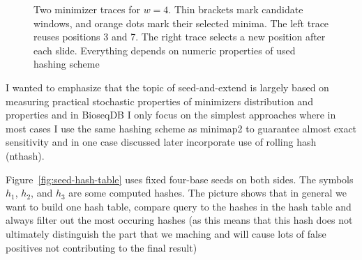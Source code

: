\begin{figure}[H]
\caption{Two minimizer traces for \(w=4\). Thin brackets mark candidate
windows, and orange dots mark their selected minima. The left trace reuses
positions 3 and 7. The right trace selects a new position after each slide. Everything depends on numeric properties of used hashing scheme}
\label{fig:minimizer-density-traces}
\end{figure}

I wanted to emphasize that the topic of seed-and-extend is largely based on measuring practical stochastic properties of minimizers distribution and properties and in BioseqDB I only focus
on the simplest approaches where in most cases I use the same hashing scheme as minimap2 to guarantee almost exact sensitivity and in one case discussed later incorporate use of rolling hash (nthash).

Figure~\ref{fig:seed-hash-table} uses fixed four-base seeds on both sides. The
symbols $h_1$, $h_2$, and $h_3$ are some computed hashes. The picture shows that in general we want to build one 
hash table, compare query to the hashes in the hash table and always filter out the most occuring hashes (as this means that this hash does not ultimately distinguish the part that we maching and will 
cause lots of false positives not contributing to the final result)

